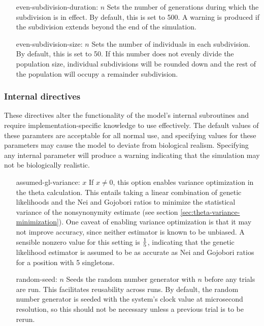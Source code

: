 \documentclass{article}
\begin{document}
\begin{description}
\begin{enumerate}
              \item[even-subdivision-duration: $n$]
              Sets the number of generations during which the subdivision is in
              effect. By default, this is set to 500. A warning is produced if
              the subdivision extends beyond the end of the simulation.

              \item[even-subdivision-size: $n$]
              Sets the number of individuals in each subdivision. By default,
              this is set to 50. If this number does not evenly divide the
              population size, individual subdivisions will be rounded down and
              the rest of the population will occupy a remainder subdivision.
            \end{enumerate}
        \end{description}

      \subsubsection{Internal directives}
        \label{sec:internal-directives}

        These directives alter the functionality of the model's internal
        subroutines and require implementation-specific knowledge to use
        effectively. The default values of these paramters are acceptable for
        all normal use, and specifying values for these parameters may cause the
        model to deviate from biological realism. Specifying any internal
        parameter will produce a warning indicating that the simulation may not
        be biologically realistic.

        \begin{enumerate}
          \item[assumed-gl-variance: $x$]
          If $x \neq 0$, this option enables variance optimization in the theta
          calculation. This entails taking a linear combination of genetic
          likelihoods and the Nei and Gojobori ratios to minimize the
          statistical variance of the nonsynonymity estimate (see section
          \ref{sec:theta-variance-minimization}). One caveat of enabling
          variance optimization is that it may not improve accuracy, since
          neither estimator is known to be unbiased. A sensible nonzero value
          for this setting is $1 \over 5$, indicating that the genetic
          likelihood estimator is assumed to be as accurate as Nei and Gojobori
          ratios for a position with 5 singletons.

          \item[random-seed: $n$]
          Seeds the random number generator with $n$ before any trials are run.
          This facilitates reusability across runs. By default, the random
          number generator is seeded with the system's clock value at
          microsecond resolution, so this should not be necessary unless a
          previous trial is to be rerun.
        \end{enumerate}
\end{document}
